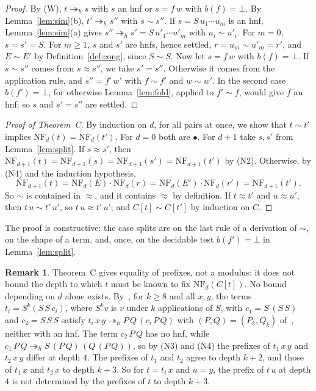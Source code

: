 \documentclass[11pt]{amsart}
\theoremstyle{definition}
\newtheorem{remark}[theorem]{Remark}
\newcommand{\hred}{\twoheadrightarrow_h}
\newcommand{\hole}{\bullet}
\newcommand{\NF}{\mathrm{NF}}
\newcommand{\cg}{\sim}
\begin{document}
\begin{proof}
By (W), $t\hred s$ with $s$ an hnf or $s=f\,w$ with $b(f)=\bot$. By Lemma~\ref{lem:sim}(b), $t'\hred
s''$ with $s\cg s''$. If $s=S\,u_1\cdots u_m$ is an hnf, Lemma~\ref{lem:sim}(a) gives $s''\hred
s'=S\,u'_1\cdots u'_m$ with $u_i\cg u'_i$. For $m=0$, $s=s'=S$. For $m\ge1$, $s$ and $s'$ are hnfs,
hence settled, $r=u_m\cg u'_m=r'$, and $E\cg E'$ by Definition~\ref{def:cong}, since $S\cg S$. Now let
$s=f\,w$ with $b(f)=\bot$. If $s\cg s''$ comes from $s\approx s''$, we take $s'=s''$. Otherwise it
comes from the application rule, and $s''=f'\,w'$ with $f\cg f'$ and $w\cg w'$. In the second case $b(f')=\bot$, for otherwise
Lemma~\ref{lem:fold}, applied to $f'\cg f$, would give $f$ an hnf; so $s$ and $s'=s''$ are settled.
\end{proof}

\begin{proof}[Proof of Theorem~C]
By induction on $d$, for all pairs at once, we show that $t\cg t'$ implies $\NF_d(t)=\NF_d(t')$.
For $d=0$ both are $\hole$. For $d+1$ take $s,s'$ from Lemma~\ref{lem:split}. If $s\approx s'$, then
$\NF_{d+1}(t)=\NF_{d+1}(s)=\NF_{d+1}(s')=\NF_{d+1}(t')$ by (N2). Otherwise, by (N4) and the induction
hypothesis,
\[
\NF_{d+1}(t)=\NF_d(E)\cdot\NF_d(r)=\NF_d(E')\cdot\NF_d(r')=\NF_{d+1}(t').
\]
So $\cg$ is contained in $\approx$, and it contains $\approx$ by definition. If $t\approx t'$ and $u\approx
u'$, then $t\,u\cg t'\,u'$, so $t\,u\approx t'\,u'$; and $C[t]\cg C[t']$ by induction on $C$.
\end{proof}

The proof is constructive: the case splits are on the last rule of a derivation of $\cg$, on the
shape of a term, and, once, on the decidable test $b(f')=\bot$ in Lemma~\ref{lem:split}.

\begin{remark}\label{rem:modulus}
Theorem~C gives equality of prefixes, not a modulus: it does not bound the depth to which $t$ must
be known to fix $\NF_d(C[t])$. No bound depending on $d$ alone exists. By~\citep[\S6]{s6}, for
$k\ge8$ and all $x,y$, the terms $t_i=S^k(S\,S\,c_i)$, where $S^kv$ is $v$ under $k$ applications of $S$, with
$c_1=S\,(S\,S)$ and $c_2=S\,S\,S$ satisfy
$t_i\,x\,y\hred P\,Q\,(c_i\,P\,Q)$ with $(P,Q)=(P_k,Q_k)$ of~\citep[Lemma~7]{s6}, neither with an hnf. The term $c_2\,P\,Q$ has no hnf,
while $c_1\,P\,Q\hred S\,(P\,Q)\,(Q\,(P\,Q))$, so by (N3) and (N4) the prefixes of $t_1\,x\,y$ and
$t_2\,x\,y$ differ at depth $4$. The prefixes of $t_1$ and $t_2$ agree to depth $k+2$, and those of $t_1\,x$ and $t_2\,x$ to depth
$k+3$. So for $t=t_i\,x$ and $u=y$, the prefix of $t\,u$ at depth $4$ is not determined by the
prefixes of $t$ to depth $k+3$.
\end{remark}
\end{document}
